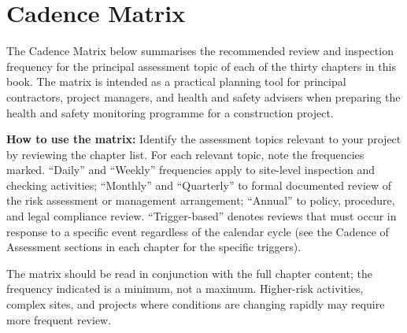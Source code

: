 \chapter{Cadence Matrix}
\label{chap:Cadence Matrix}

The Cadence Matrix below summarises the recommended review and inspection frequency for the principal assessment topic of each of the thirty chapters in this book. The matrix is intended as a practical planning tool for principal contractors, project managers, and health and safety advisers when preparing the health and safety monitoring programme for a construction project.

\textbf{How to use the matrix:} Identify the assessment topics relevant to your project by reviewing the chapter list. For each relevant topic, note the frequencies marked. ``Daily'' and ``Weekly'' frequencies apply to site-level inspection and checking activities; ``Monthly'' and ``Quarterly'' to formal documented review of the risk assessment or management arrangement; ``Annual'' to policy, procedure, and legal compliance review. ``Trigger-based'' denotes reviews that must occur in response to a specific event regardless of the calendar cycle (see the Cadence of Assessment sections in each chapter for the specific triggers).

The matrix should be read in conjunction with the full chapter content; the frequency indicated is a minimum, not a maximum. Higher-risk activities, complex sites, and projects where conditions are changing rapidly may require more frequent review.

